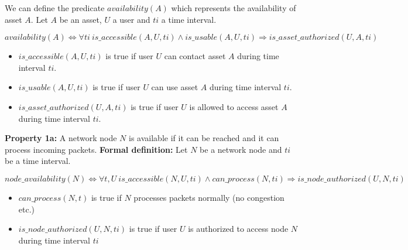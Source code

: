 We can define the predicate $availability(A)$ which represents the availability of asset $A$.
\newline
Let $A$ be an asset, $U$ a user and $ti$ a time interval.
\newline

\begin{myformula}
$availability(A) \Leftrightarrow \forall ti~is\_accessible(A,U,ti) \wedge is\_usable(A,U,ti) \Rightarrow is\_asset\_authorized(U,A,ti)$
\end{myformula}

\begin{itemize}
\item $is\_accessible(A,U,ti)$ is true if user $U$ can contact asset $A$ during time interval $ti$.
\item $is\_usable(A,U,ti)$ is true if user $U$ can use asset $A$ during time interval $ti$.
\item $is\_asset\_authorized(U,A,ti)$ is true if user $U$ is allowed to access asset $A$  during time interval $ti$.
\end{itemize}

\textbf{Property 1a:} A network node $N$ is available if it can be reached and it can process incoming packets.
\newline
\textbf{Formal definition:} Let $N$ be a network node and $ti$ be a time interval.

\begin{myformula}
$node\_availability(N) \Leftrightarrow \forall t,U~ is\_accessible(N,U,ti) \wedge can\_process(N,ti) \Rightarrow is\_node\_authorized(U,N,ti)$
\end{myformula}

\begin{itemize}
\item $can\_process(N,t)$ is true if $N$ processes packets normally (\eg no congestion etc.)
\item $is\_node\_authorized(U,N,ti)$ is true if user $U$ is authorized to access node $N$ during time interval $ti$
\end{itemize} 

